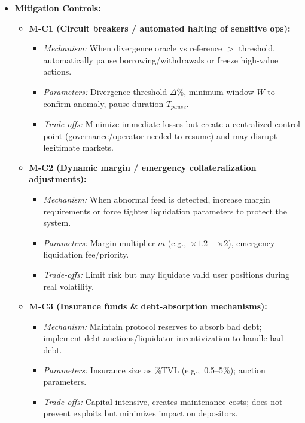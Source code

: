\begin{itemize}
    \item \textbf{Mitigation Controls:}
        \begin{itemize}
            \item \textbf{M-C1 (Circuit breakers / automated halting of sensitive ops):}
                \begin{itemize}
                    \item \textit{Mechanism:} When divergence oracle vs reference $>$ threshold, automatically pause borrowing/withdrawals or freeze high-value actions. \cite{chainalysis2023oracle}
                    \item \textit{Parameters:} Divergence threshold $\Delta\%$, minimum window $W$ to confirm anomaly, pause duration $T_{pause}$.
                    \item \textit{Trade-offs:} Minimize immediate losses but create a centralized control point (governance/operator needed to resume) and may disrupt legitimate markets.
                \end{itemize}
            \item \textbf{M-C2 (Dynamic margin / emergency collateralization adjustments):}
                \begin{itemize}
                    \item \textit{Mechanism:} When abnormal feed is detected, increase margin requirements or force tighter liquidation parameters to protect the system.
                    \item \textit{Parameters:} Margin multiplier $m$ (e.g.,\ $\times 1.2$ -- $\times 2$), emergency liquidation fee/priority.
                    \item \textit{Trade-offs:} Limit risk but may liquidate valid user positions during real volatility.
                \end{itemize}
            \item \textbf{M-C3 (Insurance funds \& debt-absorption mechanisms):}
                \begin{itemize}
                    \item \textit{Mechanism:} Maintain protocol reserves to absorb bad debt; implement debt auctions/liquidator incentivization to handle bad debt.
                    \item \textit{Parameters:} Insurance size as \%TVL (e.g.,\ 0.5--5\%); auction parameters.
                    \item \textit{Trade-offs:} Capital-intensive, creates maintenance costs; does not prevent exploits but minimizes impact on depositors.

\end{itemize}
\end{itemize}
\end{itemize}
